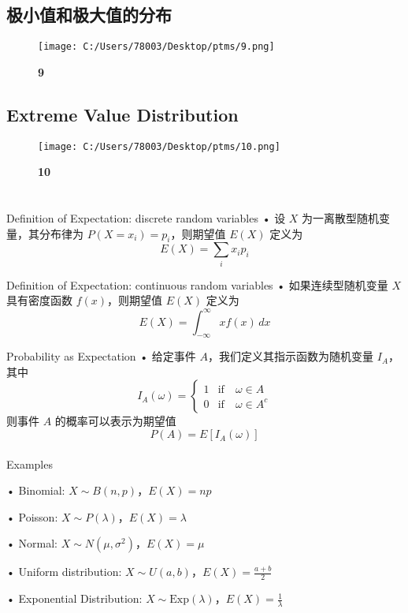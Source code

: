 \documentclass[UTF8]{report}
\theoremstyle{MyLineTheoremStyle} %
\theoremstyle{MyBlockTheoremStyle} %
\theoremstyle{MySubsubsectionStyle} %
\begin{document}
\section{极小值和极大值的分布}
    \begin{figure}[ht]
        \centering
        \texttt{[image: C:/Users/78003/Desktop/ptms/9.png]}
        \caption{\textbf{9}}
        \label{fig:9}
    \end{figure}

\section{Extreme Value Distribution}

\begin{figure}[ht]
    \centering
    \texttt{[image: C:/Users/78003/Desktop/ptms/10.png]}
    \caption{\textbf{10}}
    \label{fig:10}
\end{figure}

\chapter{}\thispagestyle{fancy} 

Definition of Expectation: 
discrete random variables
• 设 $X$ 为一离散型随机变量，其分布律为 $P(X = x_i) = p_i$，则期望值 $E(X)$ 定义为
\[
E(X) = \sum_{i} x_i p_i
\]

Definition of Expectation: 
continuous random variables
• 如果连续型随机变量 $X$ 具有密度函数 $f(x)$，则期望值 $E(X)$ 定义为
\[
E(X) = \int_{-\infty}^{\infty} x f(x) \, dx
\]

Probability as Expectation
• 给定事件 $A$，我们定义其指示函数为随机变量 $I_A$，其中
\[
I_A(\omega) = 
\begin{cases} 
1 & \text{if} \quad \omega \in  A \\ 
0 & \text{if} \quad \omega \in  A^c
\end{cases}
\]
则事件 $A$ 的概率可以表示为期望值
\[
P(A) = E[I_A(\omega)]
\]\\

Examples\par
• Binomial: $X \sim B(n, p)$，$E(X) = np$\par
• Poisson: $X \sim P(\lambda)$，$E(X) = \lambda$\par
• Normal: $X \sim N(\mu, \sigma^2)$，$E(X) = \mu$\par
• Uniform distribution: $X \sim U(a, b)$，$E(X) = \frac{a + b}{2}$\par
• Exponential Distribution: $X \sim \text{Exp}(\lambda)$，$E(X) = \frac{1}{\lambda}$\par
\end{document}
